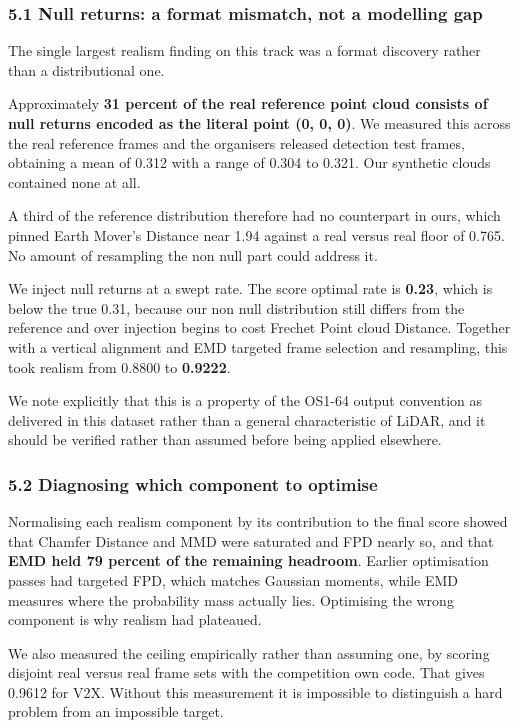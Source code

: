 \documentclass[
  10pt,
]{article}
\newcounter{none} %
\begin{document}
\subsubsection{5.1 Null returns: a format mismatch, not a modelling
gap}\label{null-returns-a-format-mismatch-not-a-modelling-gap}

The single largest realism finding on this track was a format discovery
rather than a distributional one.

Approximately \textbf{31 percent of the real reference point cloud
consists of null returns encoded as the literal point (0, 0, 0)}. We
measured this across the real reference frames and the organisers
released detection test frames, obtaining a mean of 0.312 with a range
of 0.304 to 0.321. Our synthetic clouds contained none at all.

A third of the reference distribution therefore had no counterpart in
ours, which pinned Earth Mover's Distance near 1.94 against a real
versus real floor of 0.765. No amount of resampling the non null part
could address it.

We inject null returns at a swept rate. The score optimal rate is
\textbf{0.23}, which is below the true 0.31, because our non null
distribution still differs from the reference and over injection begins
to cost Frechet Point cloud Distance. Together with a vertical alignment
and EMD targeted frame selection and resampling, this took realism from
0.8800 to \textbf{0.9222}.

We note explicitly that this is a property of the OS1-64 output
convention as delivered in this dataset rather than a general
characteristic of LiDAR, and it should be verified rather than assumed
before being applied elsewhere.

\subsubsection{5.2 Diagnosing which component to
optimise}\label{diagnosing-which-component-to-optimise}

Normalising each realism component by its contribution to the final
score showed that Chamfer Distance and MMD were saturated and FPD nearly
so, and that \textbf{EMD held 79 percent of the remaining headroom}.
Earlier optimisation passes had targeted FPD, which matches Gaussian
moments, while EMD measures where the probability mass actually lies.
Optimising the wrong component is why realism had plateaued.

We also measured the ceiling empirically rather than assuming one, by
scoring disjoint real versus real frame sets with the competition own
code. That gives 0.9612 for V2X. Without this measurement it is
impossible to distinguish a hard problem from an impossible target.
\end{document}
